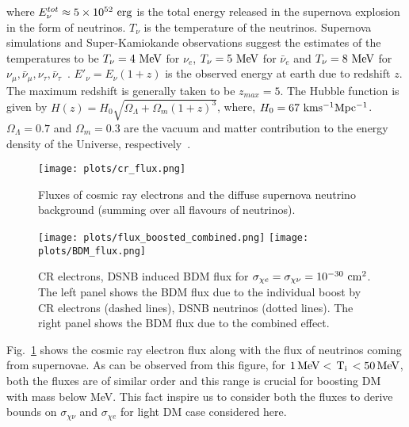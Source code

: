 \documentclass[11pt,prd,twocolumn,nofootinbib,reprint,superscriptaddress,longbibliography,colorlinks=true,citecolor=blue]{revtex4-1}
\begin{document}
 where $ E_\nu^{tot} \approx 5 \times 10^{52}~\rm{erg}$ is the total energy released in the supernova explosion in the form of neutrinos. $T_\nu$ is the temperature of the neutrinos.  Supernova simulations and Super-Kamiokande observations suggest the estimates of the temperatures to be $T_\nu = 4~\rm{MeV}$ for $\nu_e$, $T_\nu = 5~\rm{MeV}$ for $\bar{\nu}_e$ and $T_\nu = 8~\rm{MeV}$ for $\nu_\mu, \bar{\nu}_\mu, \nu_\tau, \bar{\nu}_\tau$~\cite{Lunardini:2010ab,Super-Kamiokande:2013ufi}. $E'_\nu = E_\nu (1+z)$ is the observed energy at earth due to redshift $z$. The maximum redshift is generally taken to be $z_{max}=5$. The Hubble function is given by $H(z)=H_0 \sqrt{\Omega_\Lambda + \Omega_m (1+z)^3}$, where, $H_0 = 67~\rm{km s^{-1} Mpc^{-1}}$. $\Omega_\Lambda = 0.7$ and $\Omega_m = 0.3$ are the vacuum and matter contribution to the energy density of the Universe, respectively~\cite{Planck:2018vyg}.


\begin{figure}
\centering
\texttt{[image: plots/cr\_flux.png]}
\caption{Fluxes of cosmic ray electrons and the diffuse supernova neutrino background (summing over all flavours of neutrinos).}
\protect\label{Fig:cr_flux}
\end{figure}

\begin{figure*}
\centering
\texttt{[image: plots/flux\_boosted\_combined.png]}\hfill
\texttt{[image: plots/BDM\_flux.png]}
\caption{CR electrons, DSNB induced BDM flux for $\sigma_{\chi e} = \sigma_{\chi \nu} = 10^{-30}~\rm{cm^2}$. The left panel shows the BDM flux due to the individual boost by CR electrons (dashed lines), DSNB neutrinos (dotted lines). The right panel shows the BDM flux due to the combined effect.}
\protect\label{Fig:bdm_flux}
\end{figure*}

Fig.~\ref{Fig:cr_flux} shows the cosmic ray electron flux along with the flux of neutrinos coming from supernovae. As can be observed from this figure, for $1\,{\rm MeV}<\,{\rm T_i}\,<50\,{\rm MeV}$, both the fluxes are of similar order and this range is crucial for boosting DM with mass below MeV. This fact inspire us to consider both the fluxes to derive bounds on $\sigma_{\chi\nu}$ and $\sigma_{\chi e}$ for light DM case considered here.
\end{document}

